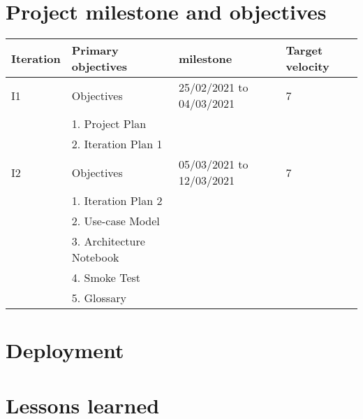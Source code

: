 \section*{Project \gls{milestone} and objectives}


\begin{tabular}{|l|l|l|l|}
\hline
Iteration & Primary objectives            & milestone                & Target velocity \\ \hline
I1        & Objectives                    & 25/02/2021 to 04/03/2021 & 7               \\
          & 1.      Project Plan          &                          &                 \\
          & 2.      Iteration Plan 1      &                          &                 \\ \hline
I2        & Objectives                    & 05/03/2021 to 12/03/2021 & 7               \\
          & 1.      Iteration Plan 2      &                          &                 \\
          & 2.      Use-case Model        &                          &                 \\
          & 3.      Architecture Notebook &                          &                 \\
          & 4.      Smoke Test            &                          &                 \\
          & 5.      Glossary              &                          &                 \\ \hline
\end{tabular}


\section*{Deployment}

\section*{Lessons learned}
